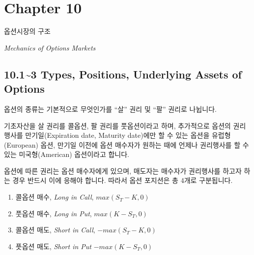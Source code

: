 \documentclass[
  letterpaper,
  DIV=11,
  numbers=noendperiod]{scrreprt}
\providecommand{\tightlist}{%
  \setlength{\itemsep}{0pt}\setlength{\parskip}{0pt}}\usepackage{longtable,booktabs,array}
\begin{document}

\chapter*{Chapter 10}\label{chapter-10}


옵션시장의 구조

\emph{Mechanics of Options Markets}

\section*{10.1\textasciitilde3 Types, Positions, Underlying Assets of
Options}\label{types-positions-underlying-assets-of-options}


옵션의 종류는 기본적으로 무엇인가를 ``살'' 권리 및 ``팔'' 권리로
나뉩니다.

기초자산을 살 권리를 콜옵션, 팔 권리를 풋옵션이라고 하며, 추가적으로
옵션의 권리행사를 만기일(Expiration date, Maturity date)에만 할 수 있는
옵션을 유럽형(European) 옵션, 만기일 이전에 옵션 매수자가 원하는 때에
언제나 권리행사를 할 수 있는 미국형(American) 옵션이라고 합니다.

옵션에 따른 권리는 옵션 매수자에게 있으며, 매도자는 매수자가 권리행사를
하고자 하는 경우 반드시 이에 응해야 합니다. 따라서 옵션 포지션은 총
4개로 구분됩니다.

\begin{enumerate}
\def\labelenumi{\arabic{enumi}.}
\tightlist
\item
  콜옵션 매수, \emph{Long in Call}, \(max(S_T-K,0)\)
\item
  풋옵션 매수, \emph{Long in Put}, \(max(K-S_T,0)\)
\item
  콜옵션 매도, \emph{Short in Call}, \(-max(S_T-K,0)\)
\item
  픗옵션 매도, \emph{Short in Put} \(-max(K-S_T,0)\)
\end{enumerate}
\end{document}
